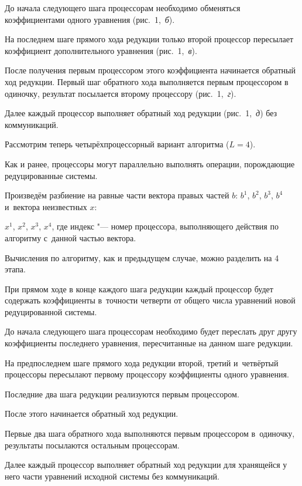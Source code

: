 До начала следующего шага процессорам необходимо обменяться коэффициентами одного уравнения (рис.~1,~{\sl б}). 

На последнем шаге прямого хода редукции только второй процессор пересылает коэффициент дополнительного уравнения (рис.~1,~{\sl в}). 

После получения первым процессором этого коэффициента начинается обратный ход редукции. Первый шаг обратного хода выполняется первым процессором в одиночку, результат посылается второму процессору (рис.~1,~{\sl г}). 

Далее каждый процессор выполняет обратный ход редукции (рис.~1,~{\sl д}) без коммуникаций.



Рассмотрим теперь четырёхпроцессорный вариант алгоритма ($L=4$).

Как и ранее, процессоры могут параллельно выполнять операции, порождающие редуцированные системы. 

Произведём разбиение на равные части вектора правых частей $b$: $b^1$, $b^2$, $b^3$, $b^4$ и~вектора неизвестных $x$: 

$x^1$, $x^2$, $x^3$, $x^4$, где индекс "--- номер процессора, выполняющего действия по алгоритму с~данной частью вектора. 

Вычисления по алгоритму, как и предыдущем случае, можно разделить на 4 этапа.



При прямом ходе в конце каждого шага редукции каждый процессор будет содержать коэффициенты в~точности четверти от общего числа уравнений новой редуцированной системы. 

До начала следующего шага процессорам необходимо будет переслать друг другу коэффициенты последнего уравнения, пересчитанные на данном шаге редукции. 

На предпоследнем шаге прямого хода редукции второй, третий и~четвёртый процессоры пересылают первому процессору коэффициенты одного уравнения. 

Последние два шага редукции реализуются первым процессором. 

После этого начинается обратный ход редукции. 

Первые два шага обратного хода выполняются первым процессором в~одиночку, результаты посылаются остальным процессорам. 

Далее каждый процессор выполняет обратный ход редукции для хранящейся у него части уравнений исходной системы без коммуникаций.



